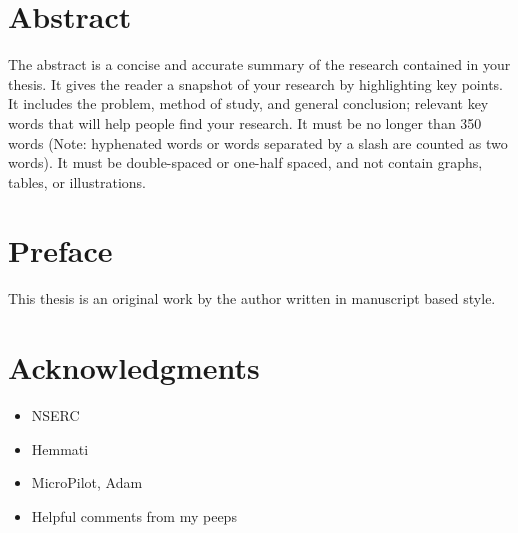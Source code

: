
\chapter{Abstract}

The abstract is a concise and accurate summary of the research
contained in your thesis. It gives the reader a snapshot of your
research by highlighting key points. It includes the problem, method of
study, and general conclusion; relevant key words that will help
people find your research. It must be no longer than 350 words (Note:
hyphenated words or words separated by a slash are counted as two
words). It must be double-spaced or one-half spaced, and not contain
graphs, tables, or illustrations.

\chapter{Preface}

This thesis is an original work by the author written in manuscript based style. 
  
\chapter{Acknowledgments}

\begin{itemize}
    \item NSERC
    \item Hemmati
    \item MicroPilot, Adam
    \item Helpful comments from my peeps
\end{itemize}


\dedication{To no one in particular.} 

\tableofcontents


\listoftables


\listoffigures


